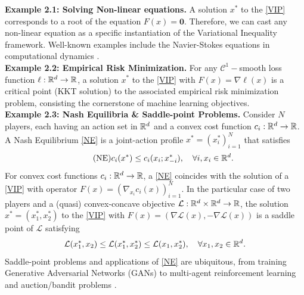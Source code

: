 %
\textbf{Example 2.1: Solving Non-linear equations.} A solution $x^*$ to the \eqref{VIP} corresponds to a root of the equation $F(x) = \textbf{0}$. Therefore, we can cast any non-linear equation as a specific instantiation of the Variational Inequality framework. Well-known examples include the Navier-Stokes equations in computational dynamics \citep{hao2021gradient}. \\
\textbf{Example 2.2: Empirical Risk Minimization.} For any $\mathcal{C}^1-$smooth loss function $\ell:\mathbb{R}^d \rightarrow \mathbb{R}$, a solution $x^*$ to the \eqref{VIP} with $F(x) = \nabla \ell(x)$ is a critical point (KKT solution) to the associated empirical risk minimization problem, consisting the cornerstone of machine learning objectives. \\
\textbf{Example 2.3: Nash Equilibria \& Saddle-point Problems.}
Consider $N$ players, each having an action set in $\mathbb{R}^d$ and a convex cost function $c_i: \mathbb{R}^d\rightarrow \mathbb{R}$. A Nash Equilibrium \eqref{NE} is a joint-action profile $x^* = (x^*_i)_{i=1}^N$ that satisfies
\begin{equation}\tag{NE}
    c_i(x^*) \leq c_i(x_i; x^*_{-i}), \quad \forall i, x_i \in \mathbb{R}^d \label{NE}.
\end{equation}
For convex cost functions $c_i: \mathbb{R}^d \rightarrow \mathbb{R}$, a \eqref{NE} coincides with the solution of a \eqref{VIP} with operator $F(x) = \left(\nabla_{x_{i}} c_i(x)\right)_{i=1}^N$. 
In the particular case of two players and a (quasi) convex-concave objective $\mathcal{L}: \mathbb{R}^d \times \mathbb{R}^d \rightarrow \mathbb{R}$, the solution $x^* = (x_1^*, x_2^*)$ to the \eqref{VIP} with $F(x) = (\nabla \mathcal{L}(x), - \nabla \mathcal{L}(x))$ is a saddle point of $\mathcal{L}$ satisfying
\begin{equation*}
    \mathcal{L}(x^*_1, x_2) \leq \mathcal{L}(x^*_1, x^*_2) \leq \mathcal{L}(x_1, x^*_2), \quad \forall x_1, x_2 \in \mathbb{R}^d. \nonumber
\end{equation*}
Saddle-point problems and applications of \eqref{NE} are ubiquitous, from training Generative Adversarial Networks (GANs) to multi-agent reinforcement learning and auction/bandit problems \citep{daskalakis2017training, zhang2021multi, pfau2016connecting}.\vspace{-1em}
